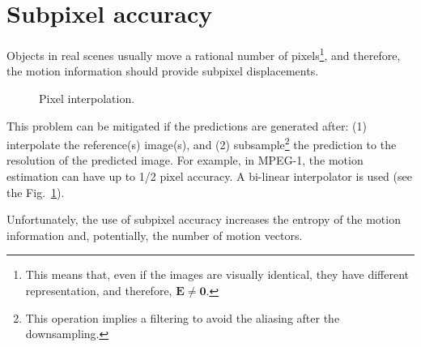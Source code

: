 
\section{Subpixel accuracy}

Objects in real scenes usually move a rational number of
pixels\footnote{This means that, even if the images are visually
  identical, they have different representation, and therefore,
  ${\mathbf E}\ne{\mathbf 0}$.}, and therefore, the motion information
should provide subpixel displacements.

\begin{figure}
  \caption{Pixel interpolation.}
  \label{fig:interpolation}
\end{figure}

This problem can be mitigated if the predictions are generated after:
(1) interpolate the reference(s) image(s), and (2)
subsample\footnote{This operation implies a filtering to avoid the
aliasing after the downsampling.} the prediction to the resolution of
the predicted image. For example, in MPEG-1, the motion estimation can have up to 1/2
  pixel accuracy. A bi-linear interpolator is used (see the
  Fig.~\ref{fig:interpolation}).

Unfortunately, the use of subpixel accuracy increases
the entropy of the motion information and, potentially, the number of
motion vectors.


